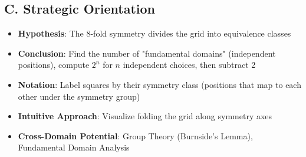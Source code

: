 \documentclass[]{article}
\begin{document}
\begin{problemconfigbox}
\subsection*{C. Strategic Orientation}
\begin{itemize}[leftmargin=*]
    \item \textbf{Hypothesis}: The 8-fold symmetry divides the grid into equivalence classes
    \item \textbf{Conclusion}: Find the number of "fundamental domains" (independent positions), compute $2^n$ for $n$ independent choices, then subtract 2
    \item \textbf{Notation}: Label squares by their symmetry class (positions that map to each other under the symmetry group)
    \item \textbf{Intuitive Approach}: Visualize folding the grid along symmetry axes
    \item \textbf{Cross-Domain Potential}: Group Theory (Burnside's Lemma), Fundamental Domain Analysis
\end{itemize}
\end{problemconfigbox}
\end{document}
